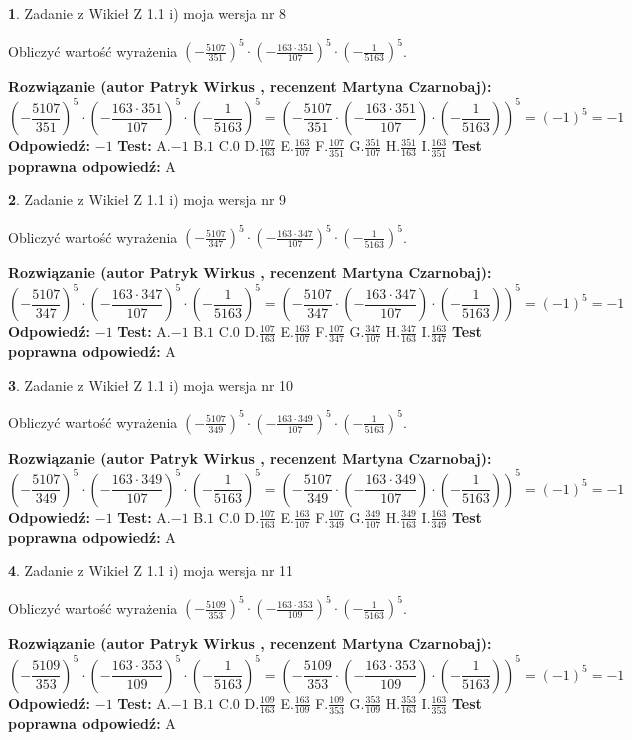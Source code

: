 \documentclass[12pt, a4paper]{article}
\theoremstyle{definition} %
\newtheorem{zad}{}
\newcommand{\zadStart}[1]{\begin{zad}#1\newline}
\newcommand{\zadStop}{\end{zad}}
\newcommand{\rozwStart}[2]{\noindent \textbf{Rozwiązanie (autor #1 , recenzent #2): }\newline}
\newcommand{\rozwStop}{\newline}
\newcommand{\odpStart}{\noindent \textbf{Odpowiedź:}\newline}
\newcommand{\odpStop}{\newline}
\newcommand{\testStart}{\noindent \textbf{Test:}\newline}
\newcommand{\testStop}{\newline}
\newcommand{\kluczStart}{\noindent \textbf{Test poprawna odpowiedź:}\newline}
\newcommand{\kluczStop}{\newline}
\begin{document}
\zadStart{Zadanie z Wikieł Z 1.1 i) moja wersja nr 8}

Obliczyć wartość wyrażenia $(-\frac{5107}{351})^{5} \cdot (-\frac{163 \cdot 351}{107})^{5} \cdot (-\frac{1}{5163})^{5}$.
\zadStop
\rozwStart{Patryk Wirkus}{Martyna Czarnobaj}
$$(-\frac{5107}{351})^{5} \cdot (-\frac{163 \cdot 351}{107})^{5} \cdot (-\frac{1}{5163})^{5} = (-\frac{5107}{351} \cdot (-\frac{163 \cdot 351}{107}) \cdot (-\frac{1}{5163}))^{5} = (-1)^{5} = -1$$
\rozwStop
\odpStart
$-1$
\odpStop
\testStart
A.$-1$ B.$1$ C.$0$ D.$\frac{107}{163}$ E.$\frac{163}{107}$
F.$\frac{107}{351}$ G.$\frac{351}{107}$
H.$\frac{351}{163}$
I.$\frac{163}{351}$
\testStop
\kluczStart
A
\kluczStop



\zadStart{Zadanie z Wikieł Z 1.1 i) moja wersja nr 9}

Obliczyć wartość wyrażenia $(-\frac{5107}{347})^{5} \cdot (-\frac{163 \cdot 347}{107})^{5} \cdot (-\frac{1}{5163})^{5}$.
\zadStop
\rozwStart{Patryk Wirkus}{Martyna Czarnobaj}
$$(-\frac{5107}{347})^{5} \cdot (-\frac{163 \cdot 347}{107})^{5} \cdot (-\frac{1}{5163})^{5} = (-\frac{5107}{347} \cdot (-\frac{163 \cdot 347}{107}) \cdot (-\frac{1}{5163}))^{5} = (-1)^{5} = -1$$
\rozwStop
\odpStart
$-1$
\odpStop
\testStart
A.$-1$ B.$1$ C.$0$ D.$\frac{107}{163}$ E.$\frac{163}{107}$
F.$\frac{107}{347}$ G.$\frac{347}{107}$
H.$\frac{347}{163}$
I.$\frac{163}{347}$
\testStop
\kluczStart
A
\kluczStop



\zadStart{Zadanie z Wikieł Z 1.1 i) moja wersja nr 10}

Obliczyć wartość wyrażenia $(-\frac{5107}{349})^{5} \cdot (-\frac{163 \cdot 349}{107})^{5} \cdot (-\frac{1}{5163})^{5}$.
\zadStop
\rozwStart{Patryk Wirkus}{Martyna Czarnobaj}
$$(-\frac{5107}{349})^{5} \cdot (-\frac{163 \cdot 349}{107})^{5} \cdot (-\frac{1}{5163})^{5} = (-\frac{5107}{349} \cdot (-\frac{163 \cdot 349}{107}) \cdot (-\frac{1}{5163}))^{5} = (-1)^{5} = -1$$
\rozwStop
\odpStart
$-1$
\odpStop
\testStart
A.$-1$ B.$1$ C.$0$ D.$\frac{107}{163}$ E.$\frac{163}{107}$
F.$\frac{107}{349}$ G.$\frac{349}{107}$
H.$\frac{349}{163}$
I.$\frac{163}{349}$
\testStop
\kluczStart
A
\kluczStop



\zadStart{Zadanie z Wikieł Z 1.1 i) moja wersja nr 11}

Obliczyć wartość wyrażenia $(-\frac{5109}{353})^{5} \cdot (-\frac{163 \cdot 353}{109})^{5} \cdot (-\frac{1}{5163})^{5}$.
\zadStop
\rozwStart{Patryk Wirkus}{Martyna Czarnobaj}
$$(-\frac{5109}{353})^{5} \cdot (-\frac{163 \cdot 353}{109})^{5} \cdot (-\frac{1}{5163})^{5} = (-\frac{5109}{353} \cdot (-\frac{163 \cdot 353}{109}) \cdot (-\frac{1}{5163}))^{5} = (-1)^{5} = -1$$
\rozwStop
\odpStart
$-1$
\odpStop
\testStart
A.$-1$ B.$1$ C.$0$ D.$\frac{109}{163}$ E.$\frac{163}{109}$
F.$\frac{109}{353}$ G.$\frac{353}{109}$
H.$\frac{353}{163}$
I.$\frac{163}{353}$
\testStop
\kluczStart
A
\kluczStop
\end{document}
